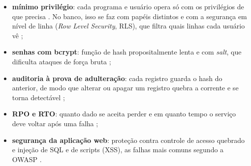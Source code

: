 \begin{itemize}
  \item \textbf{mínimo privilégio}: cada programa e usuário opera só com os privilégios de que precisa \parencite{saltzer1975}. No banco, isso se faz com papéis distintos e com a segurança em nível de linha (\textit{Row Level Security}, RLS), que filtra quais linhas cada usuário vê \parencite{pgrls};
  \item \textbf{senhas com bcrypt}: função de hash propositalmente lenta e com \textit{salt}, que dificulta ataques de força bruta \parencite{provos1999};
  \item \textbf{auditoria à prova de adulteração}: cada registro guarda o hash do anterior, de modo que alterar ou apagar um registro quebra a corrente e se torna detectável \parencite{schneier1999,haber1991};
  \item \textbf{RPO e RTO}: quanto dado se aceita perder e em quanto tempo o serviço deve voltar após uma falha \parencite{nist80034};
  \item \textbf{segurança da aplicação web}: proteção contra controle de acesso quebrado e injeção de SQL e de scripts (XSS), as falhas mais comuns segundo a OWASP \parencite{owasp2021}.
\end{itemize}
